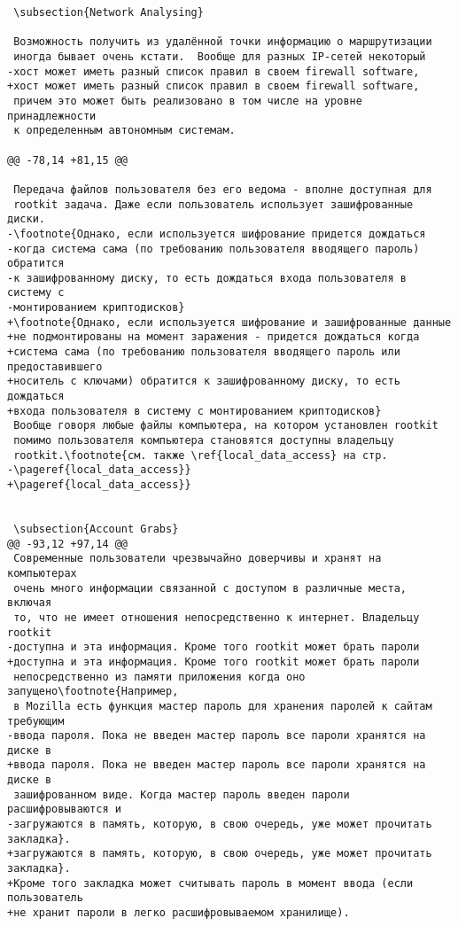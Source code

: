 \begin{verbatim}
 \subsection{Network Analysing}

 Возможность получить из удалённой точки информацию о маршрутизации
 иногда бывает очень кстати.  Вообще для разных IP-сетей некоторый
-хост может иметь разный список правил в своем firewall software,
+хост может иметь разный список правил в своем firewall software,
 причем это может быть реализовано в том числе на уровне принадлежности
 к определенным автономным системам.

@@ -78,14 +81,15 @@

 Передача файлов пользователя без его ведома - вполне доступная для
 rootkit задача. Даже если пользователь использует зашифрованные диски.
-\footnote{Однако, если используется шифрование придется дождаться
-когда система сама (по требованию пользователя вводящего пароль) обратится
-к зашифрованному диску, то есть дождаться входа пользователя в систему с
-монтированием криптодисков}
+\footnote{Однако, если используется шифрование и зашифрованные данные
+не подмонтированы на момент заражения - придется дождаться когда
+система сама (по требованию пользователя вводящего пароль или предоставившего
+носитель с ключами) обратится к зашифрованному диску, то есть дождаться
+входа пользователя в систему с монтированием криптодисков}
 Вообще говоря любые файлы компьютера, на котором установлен rootkit
 помимо пользователя компьютера становятся доступны владельцу
 rootkit.\footnote{см. также \ref{local_data_access} на стр.
-\pageref{local_data_access}}
+\pageref{local_data_access}}


 \subsection{Account Grabs}
@@ -93,12 +97,14 @@
 Современные пользователи чрезвычайно доверчивы и хранят на компьютерах
 очень много информации связанной с доступом в различные места, включая
 то, что не имеет отношения непосредственно к интернет. Владельцу rootkit
-доступна и эта информация. Кроме того rootkit может брать пароли
+доступна и эта информация. Кроме того rootkit может брать пароли
 непосредственно из памяти приложения когда оно запущено\footnote{Например,
 в Mozilla есть функция мастер пароль для хранения паролей к сайтам требующим
-ввода пароля. Пока не введен мастер пароль все пароли хранятся на диске в
+ввода пароля. Пока не введен мастер пароль все пароли хранятся на диске в
 зашифрованном виде. Когда мастер пароль введен пароли расшифровываются и
-загружаются в память, которую, в свою очередь, уже может прочитать закладка}.
+загружаются в память, которую, в свою очередь, уже может прочитать закладка}.
+Кроме того закладка может считывать пароль в момент ввода (если пользователь
+не хранит пароли в легко расшифровываемом хранилище).


\end{verbatim}

